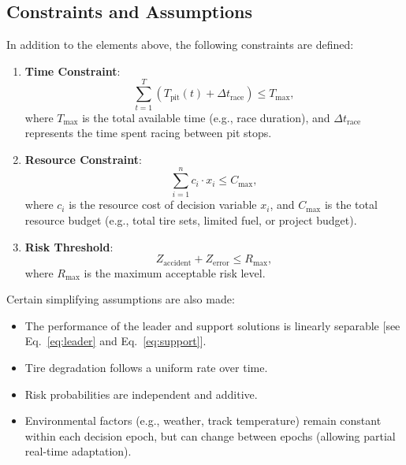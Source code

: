 \documentclass[preprint,12pt]{elsarticle}
\begin{document}
\subsection{Constraints and Assumptions}

In addition to the elements above, the following constraints are defined:

\begin{enumerate}
    \item \textbf{Time Constraint}:
    \begin{equation}
    \sum_{t=1}^{T} (T_{\text{pit}}(t) + \Delta t_{\text{race}}) \leq T_{\max},
    \end{equation}
    where \( T_{\max} \) is the total available time (e.g., race duration), and \(\Delta t_{\text{race}}\) represents the time spent racing between pit stops.

    \item \textbf{Resource Constraint}:
    \begin{equation}
    \sum_{i=1}^{n} c_i \cdot x_i \leq C_{\max},
    \end{equation}
    where \( c_i \) is the resource cost of decision variable \( x_i \), and \( C_{\max} \) is the total resource budget (e.g., total tire sets, limited fuel, or project budget).

    \item \textbf{Risk Threshold}:
    \begin{equation}
    Z_{\text{accident}} + Z_{\text{error}} \leq R_{\max},
    \end{equation}
    where \( R_{\max} \) is the maximum acceptable risk level.
\end{enumerate}

Certain simplifying assumptions are also made:

\begin{itemize}
    \item The performance of the leader and support solutions is linearly separable [see Eq.~\eqref{eq:leader} and Eq.~\eqref{eq:support}].
    \item Tire degradation follows a uniform rate over time.
    \item Risk probabilities are independent and additive.
    \item Environmental factors (e.g., weather, track temperature) remain constant within each decision epoch, but can change between epochs (allowing partial real-time adaptation).
\end{itemize}
\end{document}
